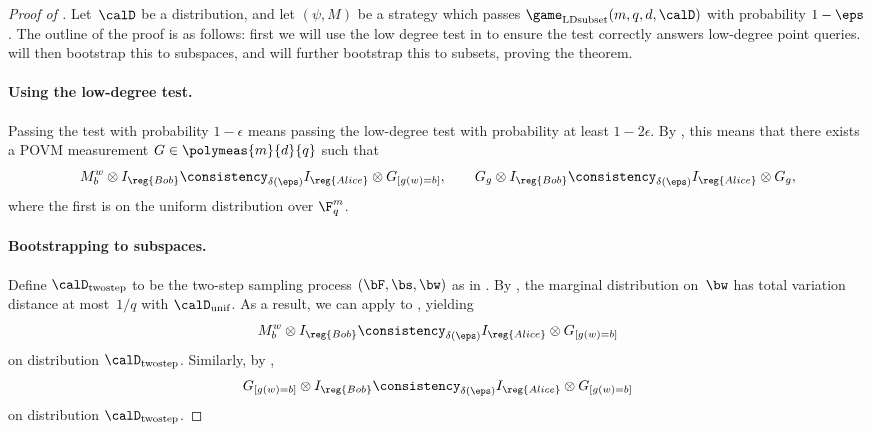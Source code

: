 \begin{proof}[Proof of ]
Let~$\calD$ be a distribution,
and let $(\psi, M)$ be a strategy which passes $\game_{\mathrm{LDsubset}}(m, q, d, \calD)$ with probability $1-\eps$.
The outline of the proof is as follows:
first we will use the low degree test in  to ensure the test correctly answers low-degree point queries.
 will then bootstrap this to subspaces,
and  will further bootstrap this to subsets, proving the theorem.

\paragraph{Using the low-degree test.}
Passing the test with probability $1-\epsilon$ means passing the low-degree test with probability at least $1-2\epsilon$.
By , this means that there exists a POVM measurement $G \in \polymeas{m}{d}{q}$ such that
\begin{equation}\label{eq:just-applied-low-degree}
M^w_b \otimes I_{\reg{Bob}} \consistency_{\delta(\eps)} I_{\reg{Alice}} \otimes G_{[g(w) = b]},
\qquad G_g \otimes I_{\reg{Bob}} \consistency_{\delta(\eps)} I_{\reg{Alice}} \otimes G_g,
\end{equation}
where the first is on the uniform distribution over $\F_q^m$.

\paragraph{Bootstrapping to subspaces.}
Define $\calD_{\mathrm{twostep}}$ to be the two-step sampling process $(\bF, \bs, \bw)$ as in .
By , the marginal distribution on~$\bw$ has total variation distance at most~$1/q$ with $\calD_{\mathrm{unif}}$.
As a result, we can apply  to , yielding
\begin{equation}\label{eq:gonna-triangle-the-shit-outta-this}
M^w_b \otimes I_{\reg{Bob}} \consistency_{\delta(\eps)} I_{\reg{Alice}} \otimes G_{[g(w) = b]}
\end{equation}
on distribution $\calD_{\mathrm{twostep}}$.
Similarly, by ,
\begin{equation}\label{eq:incoming-triangle}
G_{[g(w) = b]} \otimes I_{\reg{Bob}} \consistency_{\delta(\eps)} I_{\reg{Alice}} \otimes G_{[g(w) = b]}
\end{equation}
on distribution $\calD_{\mathrm{twostep}}$.



\end{proof}

